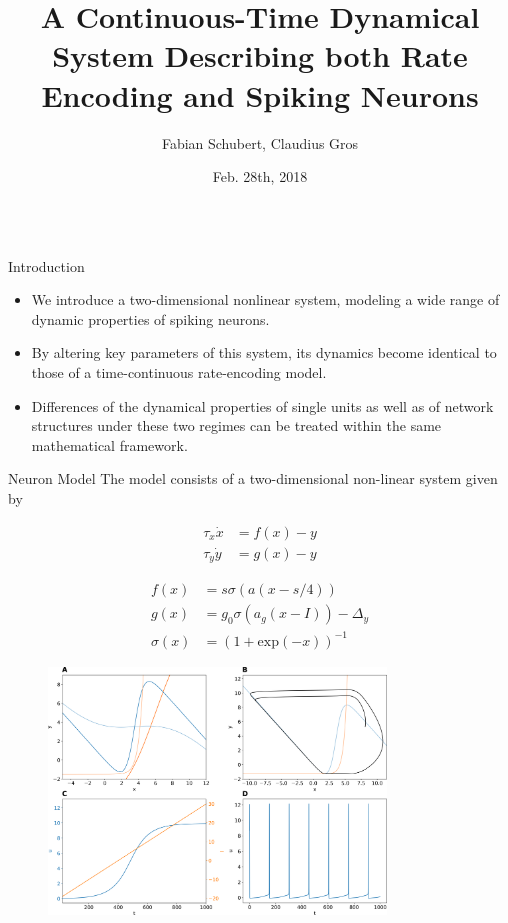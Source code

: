 \documentclass{beamer}
\title{A Continuous-Time Dynamical System Describing both Rate Encoding and Spiking Neurons}
\author{Fabian Schubert, Claudius Gros}
\institute{Institute for Theoretical Physics, Goethe University Frankfurt a.M.}
\date[Feb. 28th, 2018]{Feb. 28th, 2018}
\begin{document}
\begin{frame}[t]
\begin{columns}
\begin{column}{.45\textwidth}
\begin{block}{Introduction}
\begin{itemize}
\item We introduce a two-dimensional nonlinear system, modeling a wide range of dynamic 
properties of spiking neurons.
\item By altering key parameters of this system, its dynamics become identical to those of a 
time-continuous rate-encoding model.
\item Differences of the dynamical properties of single units as well as of network structures under 
these two regimes can be treated within the same mathematical framework.
\end{itemize}
\end{block}
\begin{block}{Neuron Model}
The model consists of a two-dimensional non-linear system given by
\begin{minipage}[t]{.5\linewidth}
\begin{align*}
\tau_x \dot{x} &= f(x) - y  \\ 
\tau_y \dot{y} &= g(x) - y 
\end{align*}
\end{minipage}%
\begin{minipage}[t]{.5\linewidth}
\begin{align*}
f(x) &= s \sigma \left(a\left(x-s/4\right)\right)  \\
g(x) &= g_0 \sigma\left(a_g\left(x-I\right)\right) - \Delta_y \\
\sigma(x) &= \left(1+\mathrm{exp}(-x)\right)^{-1}
\end{align*}
\end{minipage}
\begin{figure}
\centering
\includegraphics[width=0.8\textwidth]{../figures/graphics/dynamics_combined_figure.png}

\end{figure}
\end{block}
\end{column}
\end{columns}
\end{frame}
\end{document}
